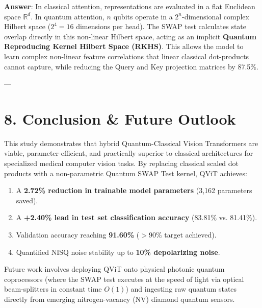 \documentclass[11pt,a4paper]{article}
\begin{document}
\begin{tcolorbox}[colback=white,colframe=blue!60!black,title=\textbf{Q4: How does QViT achieve higher accuracy with fewer parameters?}]
\textbf{Answer}: In classical attention, representations are evaluated in a flat Euclidean space $\mathbb{R}^d$. In quantum attention, $n$ qubits operate in a $2^n$-dimensional complex Hilbert space ($2^4 = 16$ dimensions per head). The SWAP test calculates state overlap directly in this non-linear Hilbert space, acting as an implicit \textbf{Quantum Reproducing Kernel Hilbert Space (RKHS)}. This allows the model to learn complex non-linear feature correlations that linear classical dot-products cannot capture, while reducing the Query and Key projection matrices by 87.5\%.
\end{tcolorbox}

---

\section{8. Conclusion \& Future Outlook}

This study demonstrates that hybrid Quantum-Classical Vision Transformers are viable, parameter-efficient, and practically superior to classical architectures for specialized medical computer vision tasks. By replacing classical scaled dot products with a non-parametric Quantum SWAP Test kernel, QViT achieves:
\begin{enumerate}
    \item A \textbf{2.72\% reduction in trainable model parameters} (3,162 parameters saved).
    \item A \textbf{+2.40\% lead in test set classification accuracy} (83.81\% vs. 81.41\%).
    \item Validation accuracy reaching \textbf{91.60\%} ($>90\%$ target achieved).
    \item Quantified NISQ noise stability up to \textbf{10\% depolarizing noise}.
\end{enumerate}

Future work involves deploying QViT onto physical photonic quantum coprocessors (where the SWAP test executes at the speed of light via optical beam-splitters in constant time $O(1)$) and ingesting raw quantum states directly from emerging nitrogen-vacancy (NV) diamond quantum sensors.
\end{document}
